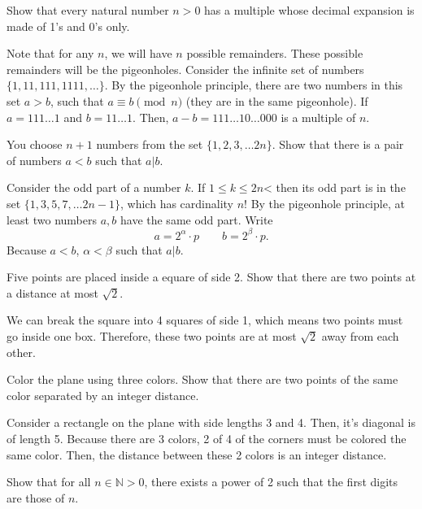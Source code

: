 \begin{eg}
	Show that every natural number \( n > 0 \) has a multiple whose decimal expansion is made of 1's and 0's only. 
\end{eg}

Note that for any \( n \), we will have \( n \) possible remainders. These possible remainders will be the pigeonholes. Consider the infinite set of numbers \( \{1,11,111,1111,\ldots \}   \). By the pigeonhole principle, there are two numbers in this set \( a>b \), such that \( a \equiv b \pmod{n} \) (they are in the same pigeonhole). If \( a = 111\ldots 1 \) and \( b=11\ldots 1 \). Then, \( a-b = 111\ldots 10\ldots 000 \) is a multiple of \( n \).

\begin{eg}
	You choose \( n+1 \) numbers from the set \( \{1,2,3,\ldots 2n\}   \). Show that there is a pair of numbers \( a<b \) such that \( a|b \).
\end{eg}

Consider the odd part of a number \( k \). If \( 1 \le k\le 2n \)< then its odd part is in the set \( \{1,3,5,7,\ldots 2n-1\}   \), which has cardinality \( n \)! By the pigeonhole principle, at least two numbers \( a,b \) have the same odd part. Write \[
	a = 2^\alpha \cdot p \qquad b = 2^{\beta }   \cdot p
.\] Because \( a < b \), \( \alpha <\beta  \) such that \( a | b \).

\begin{eg}
	Five points are placed inside a equare of side 2. Show that there are two points at a distance at most \( \sqrt{2}  \).
\end{eg}

We can break the square into 4 squares of side 1, which means two points must go inside one box. Therefore, these two points are at most \(\sqrt{2}\) away from each other.

\begin{eg}
	Color the plane using three colors. Show that there are two points of the same color separated by an integer distance.
\end{eg}

Consider a rectangle on the plane with side lengths 3 and 4. Then, it's diagonal is of length 5. Because there are 3 colors, 2 of 4 of the corners must be colored the same color. Then, the distance between these 2 colors is an integer distance.

Show that for all \( n \in \mathbb{N} > 0 \), there exists a power of 2 such that the first digits are those of \( n \).
